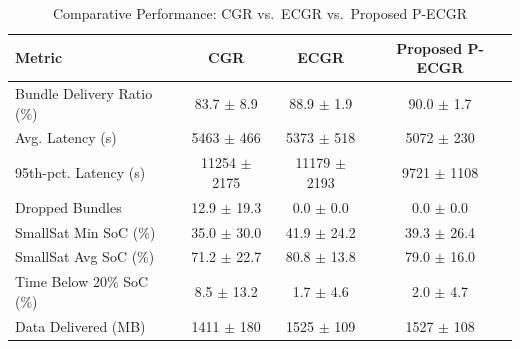 \begin{table}[t]
\centering
\caption{Comparative Performance: CGR vs.\ ECGR vs.\ Proposed P-ECGR}
\label{tab:results}
\begin{tabular*}{\textwidth}{@{\extracolsep{\fill}}lccc}
\hline
\textbf{Metric} & \textbf{CGR} & \textbf{ECGR} & \textbf{Proposed P-ECGR} \\
\hline
Bundle Delivery Ratio (\%) & 83.7 $\pm$ 8.9 & 88.9 $\pm$ 1.9 & 90.0 $\pm$ 1.7 \\
Avg. Latency (s) & 5463 $\pm$ 466 & 5373 $\pm$ 518 & 5072 $\pm$ 230 \\
95th-pct. Latency (s) & 11254 $\pm$ 2175 & 11179 $\pm$ 2193 & 9721 $\pm$ 1108 \\
Dropped Bundles & 12.9 $\pm$ 19.3 & 0.0 $\pm$ 0.0 & 0.0 $\pm$ 0.0 \\
SmallSat Min SoC (\%) & 35.0 $\pm$ 30.0 & 41.9 $\pm$ 24.2 & 39.3 $\pm$ 26.4 \\
SmallSat Avg SoC (\%) & 71.2 $\pm$ 22.7 & 80.8 $\pm$ 13.8 & 79.0 $\pm$ 16.0 \\
Time Below 20\% SoC (\%) & 8.5 $\pm$ 13.2 & 1.7 $\pm$ 4.6 & 2.0 $\pm$ 4.7 \\
Data Delivered (MB) & 1411 $\pm$ 180 & 1525 $\pm$ 109 & 1527 $\pm$ 108 \\
\hline
\end{tabular*}
\end{table}
